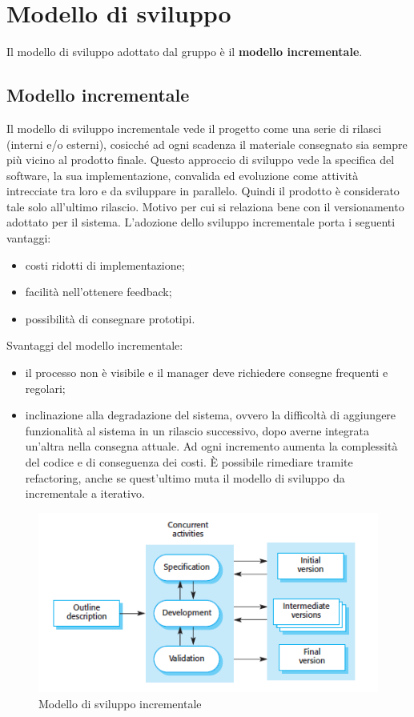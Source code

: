 \section{Modello di sviluppo}
Il modello di sviluppo adottato dal gruppo è il \textbf{modello incrementale}.
\subsection{Modello incrementale}
Il modello di sviluppo incrementale vede il progetto come una serie di rilasci (interni e/o esterni), cosicché ad ogni scadenza il materiale consegnato sia sempre più vicino al prodotto finale.
Questo approccio di sviluppo vede la specifica del software, la sua implementazione, convalida ed evoluzione come attività intrecciate tra loro e da sviluppare in parallelo. Quindi il prodotto è considerato tale solo all'ultimo rilascio. Motivo per cui si relaziona bene con il versionamento adottato per il sistema.
L'adozione dello sviluppo incrementale porta i seguenti vantaggi:
\begin{itemize}
\item costi ridotti di implementazione;
\item facilità nell'ottenere feedback;
\item possibilità di consegnare prototipi.
\end{itemize}
Svantaggi del modello incrementale:
\begin{itemize}
\item il processo non è visibile e il manager deve richiedere consegne frequenti e regolari;
\item inclinazione alla degradazione del sistema, ovvero la difficoltà di aggiungere funzionalità al sistema in un rilascio successivo, dopo averne integrata un'altra nella consegna attuale. Ad ogni incremento aumenta la complessità del codice e di conseguenza dei costi. È possibile rimediare tramite refactoring, anche se quest'ultimo muta il modello di sviluppo da incrementale a iterativo.
\end{itemize}
\begin{figure}[H]
	\centering
	\includegraphics[width=0.70\linewidth]{img/incremental_development.png}
	\caption{Modello di sviluppo incrementale}
\end{figure}

